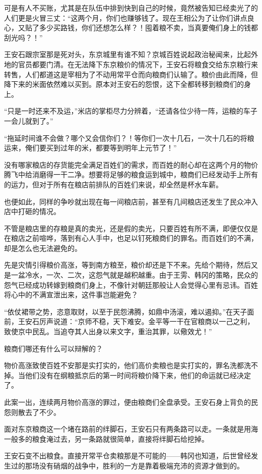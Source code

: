 可是有人不买账，尤其是在队伍中排到快到自己的时候，竟然被告知已经卖光了的人们更是火冒三丈：“这两个月，你们也赚够钱了。现在王相公为了让你们讲点良心，又贴了多少买路钱，你们还想怎么样？！囤着粮不卖，当真要俺们身上的钱都刮光吗？！”

王安石跟宗室那是死对头，东京城里有谁不知？京城百姓说起政治秘闻来，比起外地的官员都要门清。在无法降下东京粮价的情况下，王安石将粮食交给东京粮行来转售，人们都道这是宰相为了不动用常平仓而向粮商们认输了。粮价由此而降，但降下来的米面依然难以买到。原本对王安石的怨恨，这下全都转移到粮商们的身上。

“只是一时还来不及运，”米店的掌柜尽力分辨着，“还请各位少待一阵，运粮的车子一会儿就到了。”

“拖延时间谁不会做？哪个又会信你们？！等你们一次十几石，一次十几石的将粮运来，俺们要买到过年的米，都要等到明年上元节了！”

没有哪家粮店的存货能完全满足百姓们的需求，而百姓的耐心却在这两个月的物价腾飞中给消磨得一干二净。想要将足够的粮食运到城中，粮商们已经发动手上所有的运力，但对于所有在粮店前排队的百姓们来说，却全然是杯水车薪。

也便如此，同样的争吵就出现在每一间粮店前，甚至有几间粮店还发生了民众冲入店中打砸的情况。

不管是粮店里的存粮是真的卖光，还是假的卖光，只要百姓有所不满，即便仅仅是在粮店之前喧哗，落到有心人手中，也足以钉死粮商们的罪名。而百姓们的不满，却是怎么也无法避免的。

先是灾情引得粮价高涨，等到南方粮至，粮价却还是下不来。先给个期待，然后又是一盆冷水，一次、二次，这怨气就是越积越重。由于王雱、韩冈的策略，民众的怨气已经成功转嫁到粮商们身上，不像针对朝廷那般让人会觉得心里有忌讳。百姓将心中的不满宣泄出来，这件事岂能避免？

“依仗裙带之势，恣意取财，以至于民怨沸腾，如鼎中汤滚，难以遏抑。”在天子面前，王安石厉声说道：“京师不稳，天下难安。金平等一干在官粮商以一己之利，致使京中民乱。当追夺其人出身以来文字，重治其罪，以儆效尤！”

粮商们哪还有什么可以辩解的？

物价高涨致使百姓不安那是实打实的，他们高价卖粮也是实打实的，罪名洗都洗不掉。当他们没有在纲粮抵京后的第一时间将粮价降下来，他们的命运就已经决定了。

此案一出，连续两月物价高涨的罪过，便由粮商们全盘承受。王安石身上背负的民怨则散去了不少。

面对东京粮商这一个堵在路前的绊脚石，王安石只有两条路可以走。一条就是用海一般多的粮食淹过去，另一条路就很简单，直接将绊脚石给挖掉。

王安石变不出粮食。直接开常平仓卖粮那是不可能的——韩冈也知道，后世曾经发生过的那场没有硝烟的战争中，胜利的一方是靠着极端充沛的资源才做到的。

